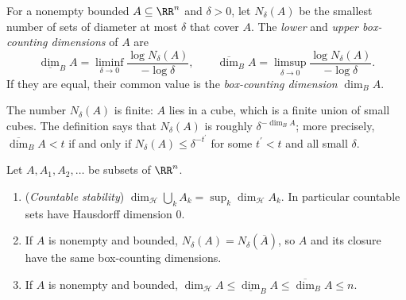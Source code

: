 \begin{definition}\label{geometric-measure-theory:definition-box-dimension}
For a nonempty bounded $A \subseteq \RR^n$ and $\delta > 0$, let $N_\delta(A)$ be the smallest number of sets of diameter at most $\delta$ that cover $A$. The \emph{lower} and \emph{upper box-counting
dimensions} of $A$ are
\[
\underline{\dim}_BA = \liminf_{\delta \to 0}\frac{\log N_\delta(A)}{-\log\delta}, \qquad \overline{\dim}_BA = \limsup_{\delta \to 0}\frac{\log N_\delta(A)}{-\log\delta}.
\]
If they are equal, their common value is the \emph{box-counting dimension} $\dim_BA$.
\end{definition}

The number $N_\delta(A)$ is finite: $A$ lies in a cube, which is a finite union of small cubes. The definition says that $N_\delta(A)$ is roughly $\delta^{-\dim_BA}$; more precisely,
$\overline{\dim}_BA < t$ if and only if $N_\delta(A) \leq \delta^{-t^{\prime}}$ for some $t^{\prime} < t$ and all small $\delta$.

\begin{proposition}\label{geometric-measure-theory:proposition-dimension-properties}
Let $A, A_1, A_2, \ldots$ be subsets of $\RR^n$.
\begin{enumerate}
\item (\emph{Countable stability}) $\dim_{\mathcal{H}}\bigcup_kA_k = \sup_k\dim_{\mathcal{H}}A_k$. In particular countable sets have Hausdorff dimension $0$.
\item If $A$ is nonempty and bounded, $N_\delta(A) = N_\delta(\overline A)$, so $A$ and its closure have the same box-counting dimensions.
\item If $A$ is nonempty and bounded, $\dim_{\mathcal{H}}A \leq \underline{\dim}_BA \leq \overline{\dim}_BA \leq n$.
\end{enumerate}
\end{proposition}

